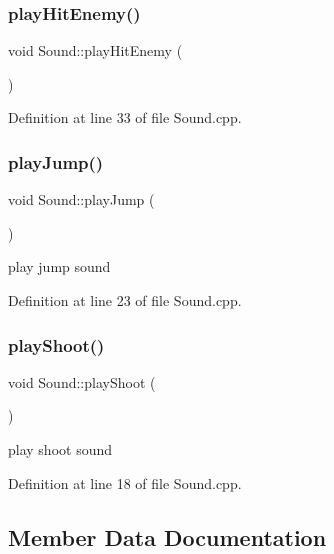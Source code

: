 \subsubsection{\texorpdfstring{play\+Hit\+Enemy()}{playHitEnemy()}}
{\footnotesize\ttfamily void Sound\+::play\+Hit\+Enemy (\begin{DoxyParamCaption}{ }\end{DoxyParamCaption})}



Definition at line 33 of file Sound.\+cpp.

\hypertarget{class_sound_a696d9a188670c54d240fce5c43ced879}{}\label{class_sound_a696d9a188670c54d240fce5c43ced879} 
\subsubsection{\texorpdfstring{play\+Jump()}{playJump()}}
{\footnotesize\ttfamily void Sound\+::play\+Jump (\begin{DoxyParamCaption}{ }\end{DoxyParamCaption})}



play jump sound 



Definition at line 23 of file Sound.\+cpp.

\hypertarget{class_sound_a4cb3a0ff7fb89b3267cc1d0e7abec829}{}\label{class_sound_a4cb3a0ff7fb89b3267cc1d0e7abec829} 
\subsubsection{\texorpdfstring{play\+Shoot()}{playShoot()}}
{\footnotesize\ttfamily void Sound\+::play\+Shoot (\begin{DoxyParamCaption}{ }\end{DoxyParamCaption})}



play shoot sound 



Definition at line 18 of file Sound.\+cpp.



\subsection{Member Data Documentation}
\hypertarget{class_sound_a8fdfa5eda5eff47c878e245c816cf4d9}{}\label{class_sound_a8fdfa5eda5eff47c878e245c816cf4d9} 
